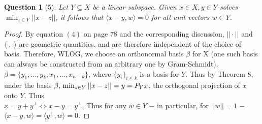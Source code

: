 \documentclass[11pt]{article}
\theoremstyle{quest}
\newtheorem*{question}{Question}
\begin{document}
\begin{question}[5]
Let $Y \subseteq X$ be a linear subspace. Given $x \in X, y \in Y$ solves $\min_{z \in Y} ||x-z||$, it follows that $\langle x-y, w \rangle = 0$ for all unit vectors $w \in Y$.
\end{question}
\begin{proof}
By equation $(4)$ on page $78$ and the corresponding discussion, $|| \cdot ||$ and $\langle \cdot, \cdot \rangle$ are geometric quantities, and are therefore independent of the choice of basis. Therefore, WLOG, we choose an orthonormal basis $\beta$ for X (one such basis can always be constructed from an arbitrary one by Gram-Schmidt). $\beta = \{y_1, \ldots, y_k, x_1, \ldots, x_{n-k}\}$, where $\{y_i\}_{i \le k}$ is a basis for $Y$. Thus by Theorem $8$, under the basis $\beta,\\ \min_{z \in Y} ||x-z|| = y = P_Y x$, the orthogonal projection of $x$ onto $Y$. Thus
\\$x = y + y^{\perp} \iff x-y = y^{\perp}$. Thus for any $w \in Y$ $\mathbf{-}$ in particular, for $||w|| = 1$ $\mathbf{-}$ $\langle x-y, w \rangle = \langle y^{\perp}, w \rangle = 0$.
\end{proof}
\end{document}
